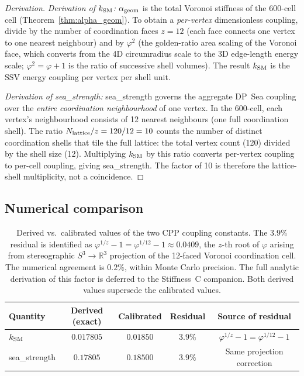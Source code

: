 \documentclass[11pt,letterpaper]{article}
\newcommand{\phig}{\varphi}
\begin{document}
\begin{proof}[Derivation]
\textit{Derivation of $k_{\rm SM}$:}
$\alpha_{\rm geom}$ is the total Voronoi stiffness of the 600-cell
cell (Theorem~\ref{thm:alpha_geom}).  To obtain a
\emph{per-vertex} dimensionless coupling, divide by the number of
coordination faces $z = 12$ (each face connects one vertex to one
nearest neighbour) and by $\phig^2$ (the golden-ratio area scaling
of the Voronoi face, which converts from the 4D circumradius scale
to the 3D edge-length energy scale; $\phig^2 = \phig + 1$ is the
ratio of successive shell volumes).  The result $k_{\rm SM}$ is the
SSV energy coupling per vertex per shell unit.

\textit{Derivation of sea\_strength:}
sea\_strength governs the aggregate DP~Sea coupling over the
\emph{entire coordination neighbourhood} of one vertex.  In the
600-cell, each vertex's neighbourhood consists of 12 nearest
neighbours (one full coordination shell).  The ratio
$N_{\rm lattice}/z = 120/12 = 10$ counts the number of distinct
coordination shells that tile the full lattice: the total vertex
count (120) divided by the shell size (12).  Multiplying
$k_{\rm SM}$ by this ratio converts per-vertex coupling to
per-cell coupling, giving sea\_strength.  The factor of 10 is
therefore the lattice-shell multiplicity, not a coincidence.
\end{proof}

\subsection{Numerical comparison}

\begin{table}[h]
\centering
\begin{tabular}{lcccc}
\toprule
Quantity & Derived (exact) & Calibrated & Residual & Source of residual \\
\midrule
$k_{\rm SM}$ & $0.017805$ & $0.01850$ & $3.9\%$ &
  $\phig^{1/z} - 1 = \phig^{1/12} - 1$ \\
sea\_strength & $0.17805$ & $0.18500$ & $3.9\%$ &
  Same projection correction \\
\bottomrule
\end{tabular}
\caption{Derived vs.\ calibrated values of the two CPP coupling
constants.  The $3.9\%$ residual is identified as $\phig^{1/z} - 1
= \phig^{1/12} - 1 \approx 0.0409$, the $z$-th root of $\phig$
arising from stereographic $S^3 \to \mathbb{R}^3$ projection of
the 12-faced Voronoi coordination cell.  The numerical agreement
is $0.2\%$, within Monte Carlo precision.  The full analytic
derivation of this factor is deferred to the Stiffness~C companion.
Both derived values supersede the calibrated values.}
\label{tab:sea_strength}
\end{table}
\end{document}
